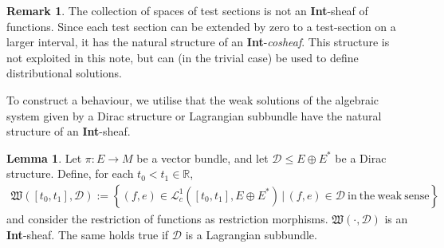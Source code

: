 \documentclass[preprint,12pt]{elsarticle}
\theoremstyle{definition}
\newtheorem{lemma}[theorem]{Lemma}
\newtheorem{remark}[theorem]{Remark}
\newcommand{\set}[1]{\left\lbrace #1\right\rbrace}
\begin{document}
\begin{remark}
The collection of spaces of test sections is not an \textbf{Int}-sheaf of functions. Since each test section can be extended by zero to a test-section on a larger interval, it has the natural structure of an \textbf{Int}-\textit{cosheaf}. This structure is not exploited in this note, but can (in the trivial case) be used to define distributional solutions.
\end{remark}

To construct a behaviour, we utilise that the weak solutions of the algebraic system given by a Dirac structure or Lagrangian subbundle have the natural structure of an \textbf{Int}-sheaf.

\begin{lemma}
Let $\pi:E\to M$ be a vector bundle, and let $\mathcal{D}\leq E\oplus E^*$ be a Dirac structure. Define, for each $t_0<t_1\in\mathbb{R}$,
\begin{align*}
\mathfrak{W}([t_0,t_1],\mathcal{D}) := \set{(f,e)\in\mathcal{L}^1_c([t_0,t_1],E\oplus E^*)\,\big\vert\,
(f,e)\in\mathcal{D}~\mathrm{in~the~weak~sense}}
\end{align*}
and consider the restriction of functions as restriction morphisms. $\mathfrak{W}(\cdot,\mathcal{D})$ is an \textbf{Int}-sheaf. The same holds true if $\mathcal{D}$ is a Lagrangian subbundle.
\end{lemma}
\end{document}
